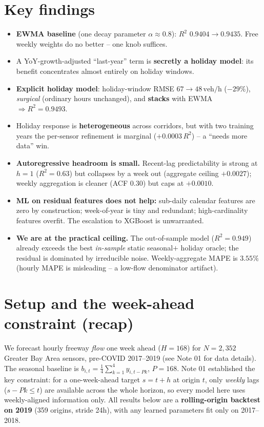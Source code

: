 \documentclass[11pt]{article}
\newcommand{\veh}{\,\text{veh/h}}
\begin{document}
\section*{Key findings}
\begin{itemize}
\item \textbf{EWMA baseline} (one decay parameter $\alpha\approx0.8$): $R^2$
  $0.9404\!\to\!0.9435$. Free weekly weights do no better -- one knob suffices.
\item A YoY-growth-adjusted ``last-year'' term is \textbf{secretly a holiday
  model}: its benefit concentrates almost entirely on holiday windows.
\item \textbf{Explicit holiday model}: holiday-window RMSE $67\!\to\!48\veh$
  ($-29\%$), \emph{surgical} (ordinary hours unchanged), and \textbf{stacks}
  with EWMA $\Rightarrow R^2=0.9493$.
\item Holiday response is \textbf{heterogeneous} across corridors, but with two
  training years the per-sensor refinement is marginal ($+0.0003\,R^2$) -- a
  ``needs more data'' win.
\item \textbf{Autoregressive headroom is small.} Recent-lag predictability is
  strong at $h{=}1$ ($R^2{=}0.63$) but collapses by a week out (aggregate ceiling
  $+0.0027$); weekly aggregation is cleaner (ACF $0.30$) but caps at $+0.0010$.
\item \textbf{ML on residual features does not help:} sub-daily calendar features
  are zero by construction; week-of-year is tiny and redundant; high-cardinality
  features overfit. The escalation to XGBoost is unwarranted.
\item \textbf{We are at the practical ceiling.} The out-of-sample model
  ($R^2{=}0.949$) already exceeds the best \emph{in-sample} static seasonal$+$
  holiday oracle; the residual is dominated by irreducible noise. Weekly-aggregate
  MAPE is $3.55\%$ (hourly MAPE is misleading -- a low-flow denominator artifact).
\end{itemize}

\section{Setup and the week-ahead constraint (recap)}
We forecast hourly freeway \emph{flow} one week ahead ($H=168$) for $N=2{,}352$
Greater Bay Area sensors, pre-COVID 2017--2019 (see Note 01 for data details).
The seasonal baseline is $b_{i,t}=\frac14\sum_{k=1}^4 y_{i,t-Pk}$, $P=168$.
Note 01 established the key constraint: for a one-week-ahead target $s=t+h$ at
origin $t$, only \emph{weekly} lags ($s-Pk\le t$) are available across the whole
horizon, so every model here uses weekly-aligned information only. All results
below are a \textbf{rolling-origin backtest on 2019} (359 origins, stride 24h),
with any learned parameters fit only on 2017--2018.
\end{document}
